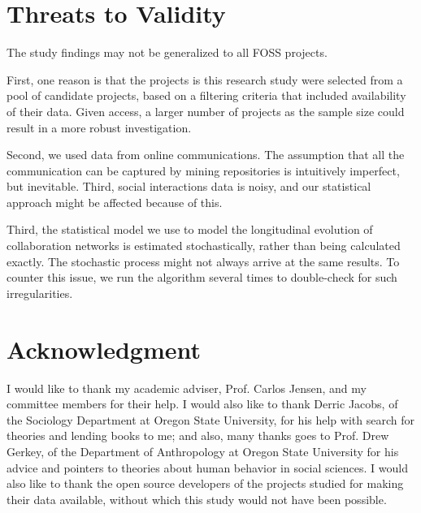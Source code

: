 \documentclass[11pt]{report}
\begin{document}
\pagebreak

\section{Threats to Validity}
\label{threatsToValidity}
The study findings may not be generalized to all FOSS projects. 

First, one reason is that the projects is this research study were selected from a pool of candidate projects, based on a filtering criteria that included availability of their data. Given access, a larger number of projects as the sample size could result in a more robust investigation. 

Second, we used data from online communications. The assumption that all the communication can be captured by mining repositories is intuitively imperfect, but inevitable. Third, social interactions data is noisy, and our statistical approach might be affected because of this. 

Third, the statistical model we use to model the longitudinal evolution of collaboration networks is estimated stochastically, rather than being calculated exactly. The stochastic process might not always arrive at the same results. To counter this issue, we run the algorithm several times to double-check for such irregularities.


\section*{Acknowledgment}
\label{acknowledgments}
I would like to thank my academic adviser, Prof. Carlos Jensen, and my committee members for their help. I would also like to thank Derric Jacobs, of the Sociology Department at Oregon State University, for his help with search for theories and lending books to me; and also, many thanks goes to Prof. Drew Gerkey, of the Department of Anthropology at Oregon State University for his advice and pointers to theories about human behavior in social sciences.
I would also like to thank the open source developers of the projects studied for making their data available, without which this study would not have been possible. \\


%

\pagebreak
\end{document}
